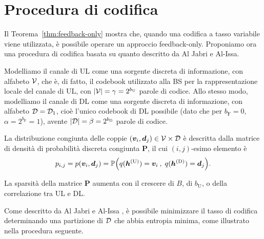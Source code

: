 \section{Procedura di codifica}
\label{sec:procedure}

Il Teorema~\ref{thm:feedback-only} mostra che, quando una codifica a tasso
variabile viene utilizzata, è possibile operare un approccio feedback-only.
Proponiamo ora una procedura di codifica basata su quanto descritto da Al Jabri
e Al-Issa.\cite{10.1007/BFb0024445}

Modelliamo il canale di UL come una sorgente discreta di informazione, con
alfabeto \(\mathcal{V}\), che è, di fatto, il codebook utilizzato alla BS per la
rappresentazione locale del canale di UL, con \(\abs{\set{V}} = \gamma =
2^{b_\mathrm{U}}\) parole di codice. Allo stesso modo, modelliamo il canale di
DL come una sorgente discreta di informazione, con alfabeto \(\mathcal{D} =
\mathcal{D}_1\), cioè l'unico codebook di DL possibile (dato che per \(b_\mathrm{F}
= 0\), \(\alpha = 2^{b_\mathrm{F}} = 1\)), avente \(\abs{\set{D}} = \beta =
2^{b_\mathrm{B}}\) parole di codice.

La distribuzione congiunta delle coppie \((\bm{v}_i,\bm{d}_j) \in
\mathcal{V} \times \mathcal{D}\) è descritta dalla matrice di densità di probabilità
discreta congiunta \(\bm{P}\), il cui \((i,j)\)-esimo elemento è
\begin{equation}
    p_{i,j} = p(\bm{v}_i, \bm{d}_j) = \prob{
        q(\bm{h}^\mathrm{(U)}) = \bm{v}_i \:,\;
        q(\bm{h}^\mathrm{(D)}) = \bm{d}_j
    } .
\end{equation}

La sparsità della matrice \(\bm{P}\) aumenta con il crescere di \(B\), di
\(b_\mathrm{U}\), o della correlazione tra UL e DL.

Come descritto da Al Jabri e Al-Issa \cite{10.1007/BFb0024445}, è possibile
minimizzare il tasso di codifica determinando una partizione di \(\mathcal{D}\) che
abbia entropia minima, come illustrato nella procedura seguente.

